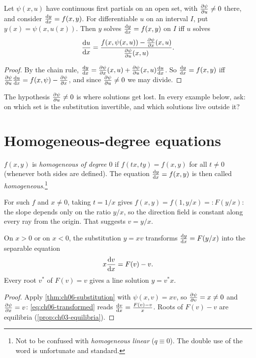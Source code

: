 \begin{theorem}\label{thm:ch06-substitution}
Let $\psi(x,u)$ have continuous first partials on an open set, with
$\frac{\partial \psi}{\partial u}\neq 0$ there, and consider $\frac{\mathrm{d}y}{\mathrm{d}x} = f(x,y)$. For
differentiable $u$ on an interval $I$, put $y(x) = \psi(x,u(x))$. Then $y$
solves $\frac{\mathrm{d}y}{\mathrm{d}x} = f(x,y)$ on $I$ iff $u$ solves
\begin{equation}\label{eq:ch06-transformed}
  \frac{\mathrm{d}u}{\mathrm{d}x} = \frac{f(x,\psi(x,u)) - \frac{\partial \psi}{\partial x}(x,u)}{\frac{\partial \psi}{\partial u}(x,u)} .
\end{equation}
\end{theorem}
\begin{proof}
By the chain rule, $\frac{\mathrm{d}y}{\mathrm{d}x} = \frac{\partial \psi}{\partial x}(x,u) + \frac{\partial \psi}{\partial u}(x,u)\frac{\mathrm{d}u}{\mathrm{d}x}$.
So $\frac{\mathrm{d}y}{\mathrm{d}x} = f(x,y)$ iff
$\frac{\partial \psi}{\partial u}\frac{\mathrm{d}u}{\mathrm{d}x} = f(x,\psi) - \frac{\partial \psi}{\partial x}$, and since
$\frac{\partial \psi}{\partial u}\neq 0$ we may divide.
\end{proof}

The hypothesis $\frac{\partial \psi}{\partial u}\neq0$ is where solutions get lost. In every
example below, ask: on which set is the substitution invertible, and which
solutions live outside it?

\section{Homogeneous-degree equations}\label{sec:ch06-homogeneous}

\begin{definition}\label{def:ch06-homogeneous}
$f(x,y)$ is \emph{homogeneous of degree $0$} if $f(tx,ty) = f(x,y)$ for all
$t\neq 0$ (whenever both sides are defined). The equation $\frac{\mathrm{d}y}{\mathrm{d}x} = f(x,y)$
is then called \emph{homogeneous}.\footnote{Not to be confused with
\emph{homogeneous linear} ($q\equiv 0$). The double use of the word is
unfortunate and standard.}
\end{definition}

For such $f$ and $x\neq0$, taking $t = 1/x$ gives $f(x,y) = f(1,y/x) =: F(y/x)$:
the slope depends only on the ratio $y/x$, so the direction field is constant
along every ray from the origin. That suggests $v = y/x$.

\begin{proposition}\label{prop:ch06-homogeneous}
On $x>0$ or on $x<0$, the substitution $y = xv$ transforms $\frac{\mathrm{d}y}{\mathrm{d}x} = F(y/x)$
into the separable equation
\[
  x\frac{\mathrm{d}v}{\mathrm{d}x} = F(v) - v .
\]
Every root $v^*$ of $F(v) = v$ gives a line solution $y = v^*x$.
\end{proposition}
\begin{proof}
Apply \cref{thm:ch06-substitution} with $\psi(x,v) = xv$, so $\frac{\partial \psi}{\partial v} = x\neq0$
and $\frac{\partial \psi}{\partial x} = v$: \eqref{eq:ch06-transformed} reads
$\frac{\mathrm{d}v}{\mathrm{d}x} = \frac{F(v) - v}{x}$. Roots of $F(v) - v$ are equilibria
(\cref{prop:ch03-equilibria}).
\end{proof}

